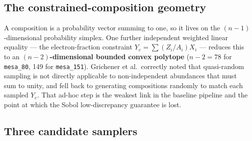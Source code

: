 \documentclass[11pt]{article}
\begin{document}
\subsection{The constrained-composition geometry}

A composition is a probability vector summing to one, so it lives on the $(n-1)$-dimensional probability simplex. One further independent weighted linear equality --- the electron-fraction constraint $Y_e = \sum (Z_i/A_i) X_i$ --- reduces this to an \textbf{$(n-2)$-dimensional bounded convex polytope} ($n-2 = 78$ for \texttt{mesa\_80}, 149 for \texttt{mesa\_151}). Grichener et al.\ correctly noted that quasi-random sampling is not directly applicable to non-independent abundances that must sum to unity, and fell back to generating compositions randomly to match each sampled $Y_e$. That ad-hoc step is the weakest link in the baseline pipeline and the point at which the Sobol low-discrepancy guarantee is lost.

\subsection{Three candidate samplers}
\end{document}

